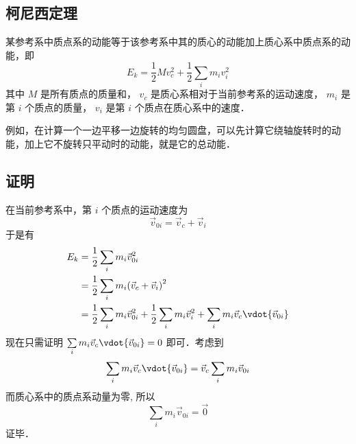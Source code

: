 

\subsection{柯尼西定理}
某参考系中质点系的动能等于该参考系中其的质心的动能加上质心系中质点系的动能，即
\begin{equation}
{E_k} = \frac{1}{2}Mv_c^2 + \frac{1}{2}\sum\limits_i {{m_i}v_i^2} 
\end{equation} 
其中 $M$ 是所有质点的质量和， $v_c$ 是质心系相对于当前参考系的运动速度， $m_i$ 是第 $i$ 个质点的质量， $v_i$ 是第 $i$ 个质点在质心系中的速度．

例如，在计算一个一边平移一边旋转的均匀圆盘，可以先计算它绕轴旋转时的动能，加上它不旋转只平动时的动能，就是它的总动能．

\subsection{证明}
在当前参考系中，第 $i$ 个质点的运动速度为
\begin{equation}
{\vec v_{0i}} = {\vec v_c} + {\vec v_i}
\end{equation}
于是有
\begin{equation}\begin{split}
{E_k} &= \frac{1}{2}\sum\limits_i {{m_i}\vec v_{0i}^2} \\
      &= \frac{1}{2}\sum\limits_i {{m_i}{{\left( {{{\vec v}_c} + {{\vec v}_i}} \right)}^2}} \\
 &= \frac{1}{2}\sum\limits_i {{m_i}\vec v_{0i}^2}  + \frac{1}{2}\sum\limits_i {{m_i}\vec v_i^2}  + \sum\limits_i {{m_i}{{\vec v}_c} \vdot {{\vec v}_{0i}}} 
\end{split}\end{equation}
现在只需证明 $\sum\limits_i {{m_i}{{\vec v}_c} \vdot {{\vec v}_{0i}}}  = 0$ 即可．考虑到
\begin{equation}
\sum\limits_i {{m_i}{{\vec v}_c} \vdot {{\vec v}_{0i}}}  = {\vec v_c}\sum\limits_i {{m_i}{{\vec v}_{0i}}}
\end{equation}
而质心系中的质点系动量为零,%
所以
\begin{equation}
\sum\limits_i {{m_i}{{\vec v}_{0i}}}  = \vec 0
\end{equation}
证毕．

